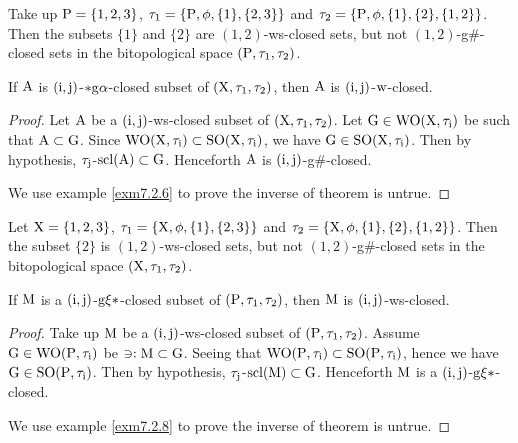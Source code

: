 \begin{exm}\label{exm7.2.4}
Take up $\mathrm{P}= \{1,2,3\}$, $\tau_1 =\{\mathrm{P}, \phi, \{1\}, \{2,3\}\}$ and $\tau_2 =\{\TSP, \phi, \{1\},\break \{2\}, \{1,2\}\}$. Then the subsets $\{1\}$ and $\{2\}$ are $(1, 2)$-ws-closed sets, but not $(1, 2)$-g\#-closed sets in the bitopological space $(\mathrm{P}, \tau_1, \tau_2 )$.
\end{exm}

\begin{thm}\label{thm7.2.5}
If $\mathrm{A}$ is $(\mathrm{i}, \mathrm{j})$-$*\mathrm{g}\alpha$-closed subset of $(\mathrm{X}, \tau_1, \tau_2)$, then $\mathrm{A}$ is $(\mathrm{i}, \mathrm{j})$-$\mathrm{w}$-closed.
\end{thm}

\begin{proof}
Let $\mathrm{A}$ be a $(\mathrm{i}, \mathrm{j})$-ws-closed subset of $(\mathrm{X}, \tau_1, \tau_2)$. Let $\mathrm{G}\in\mathrm{W}\mathrm{O}(\mathrm{X}, \tau_{\mathrm{i}})$ be such that $\mathrm{A} \subset \mathrm{G}$. Since $\mathrm{W}\mathrm{O}(\mathrm{X}, \tau_{\mathrm{i}}) \subset \mathrm{S}\mathrm{O}(\mathrm{X}, \tau_{\mathrm{i}})$, we have $\mathrm{G}\in\mathrm{S}\mathrm{O}(\mathrm{X}, \tau_{\mathrm{i}})$. Then by hypothesis, $\tau_{\mathrm{j}}$-$\mathrm{scl}(\mathrm{A}) \subset \mathrm{G}$. Henceforth $\mathrm{A}$ is $(\mathrm{i}, \mathrm{j})$-g\#-closed.

We use example \ref{exm7.2.6} to prove the inverse of theorem is untrue.
\end{proof}

\begin{exm}\label{exm7.2.6}
Let $\mathrm{X}= \{1, 2, 3\}$, $\tau_1 =\{\mathrm{X}, \phi, \{1\}, \{2,3\}\}$ and $\tau_2 =\{\TSX, \phi, \{1\}, \{2\},\break \{1,2\}\}$. Then the subset $\{2\}$ is $(1, 2)$-ws-closed sets, but not $(1, 2)$-g\#-closed sets in the bitopological space $(\mathrm{X}, \tau_1, \tau_2 )$.
\end{exm}

\begin{thm}\label{thm7.2.7}
If $\mathrm{M}$ is a $(\mathrm{i}, \mathrm{j})$-$\mathrm{g}\xi*$-closed subset of $(\mathrm{P}, \tau_1, \tau_2)$, then $\mathrm{M}$ is $(\mathrm{i}, \mathrm{j})$-ws-closed.
\end{thm}

\begin{proof}
Take up $\mathrm{M}$ be a $(\mathrm{i}, \mathrm{j})$-ws-closed subset of $(\mathrm{P}, \tau_1, \tau_2 )$. Assume $\mathrm{G}\in \mathrm{W}\mathrm{O}(\mathrm{P}, \tau_{\mathrm{i}})$ be $\ni: \mathrm{M} \subset
\mathrm{G}$. Seeing that $\mathrm{W}\mathrm{O}(\mathrm{P}, \tau_{\mathrm{i}}) \subset \mathrm{S}\mathrm{O}(\mathrm{P}, \tau_{\mathrm{i}})$, hence we have $\mathrm{G}\in\mathrm{S}\mathrm{O}(\mathrm{P}, \tau_{\mathrm{i}})$. Then by hypothesis, $\tau_{\mathrm{j}}$-$\mathrm{scl}(\mathrm{M}) \subset \mathrm{G}$. Henceforth $\mathrm{M}$ is a $(\mathrm{i}, \mathrm{j})$-$\mathrm{g}\xi*$-closed.

We use example \ref{exm7.2.8} to prove the inverse of theorem is untrue.
\end{proof}

